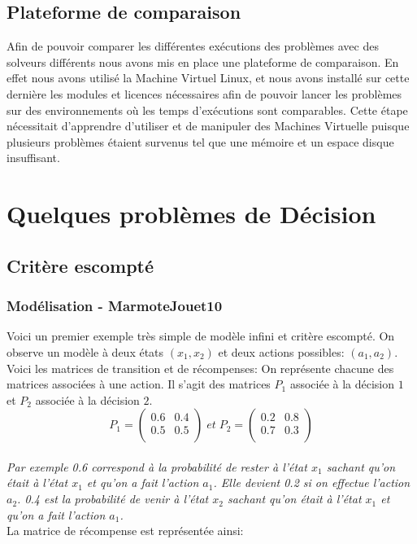 \documentclass{article}
\begin{document}
\subsection{Plateforme de comparaison}
Afin de pouvoir comparer les différentes exécutions des problèmes avec des solveurs différents nous avons mis en place une plateforme de comparaison. En effet nous avons utilisé la Machine Virtuel Linux, et nous avons installé sur cette dernière les modules et licences nécessaires afin de pouvoir lancer les problèmes sur des environnements où les temps d'exécutions sont comparables. Cette étape nécessitait d'apprendre d'utiliser et de manipuler des Machines Virtuelle puisque plusieurs problèmes étaient survenus tel que une mémoire et un espace disque insuffisant.
\section{Quelques problèmes de Décision }
\subsection{Critère escompté}
\subsubsection{Modélisation - MarmoteJouet10}
Voici un premier exemple très simple de modèle infini et critère escompté. On observe un modèle à deux états $(x_1,x_2)$ et deux actions possibles: $(a_1,a_2)$. Voici les matrices de transition et de récompenses:
\noindent On représente chacune des matrices associées à une action. Il s’agit des matrices $P_1$ associée à la décision $1$ et $P_2$ associée à la décision $2$.\\

$$ P_1 = \begin{pmatrix}
0.6 & 0.4  \\
0.5 & 0.5 \\
\end{pmatrix} \; et \; P_2 = \begin{pmatrix}
0.2 & 0.8  \\
0.7 & 0.3 \\
\end{pmatrix}$$ \\
 \textit{
 Par exemple 0.6 correspond à la probabilité de rester à l'état $x_1$ sachant qu'on était à l'état $x_1$ et qu'on a fait l'action $a_1$. Elle devient 0.2 si on effectue l'action $a_2$. 0.4 est la probabilité de venir à l'état $x_2$ sachant qu'on était à l'état $x_1$ et qu'on a fait l'action $a_1$. }\\
 La matrice de récompense est représentée ainsi:
 
\end{document}
